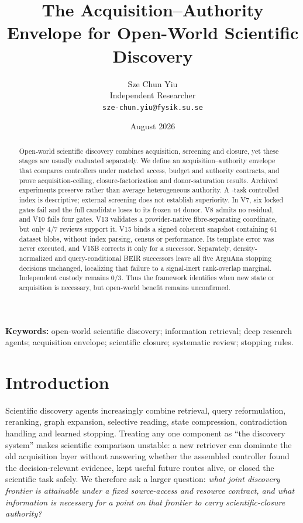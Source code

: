 \documentclass[11pt]{article}
\title{The Acquisition--Authority Envelope for Open-World Scientific Discovery}
\author{Sze Chun Yiu\\Independent Researcher\\\texttt{sze-chun.yiu@fysik.su.se}}
\date{August 2026}
\theoremstyle{definition}
\begin{document}
\maketitle

\begin{abstract}
Open-world scientific discovery combines acquisition, screening and closure,
yet these stages are usually evaluated separately. We define an
acquisition--authority envelope that compares controllers under matched access,
budget and authority contracts, and prove acquisition-ceiling,
closure-factorization and donor-saturation results. Archived experiments
preserve rather than average heterogeneous authority. A \OfflineTaskCount{}-task controlled
index is descriptive; external screening does not establish superiority. In
V7, six locked gates fail and the full candidate loses to its frozen u4 donor.
V8 admits no residual, and V10 fails four gates. V13 validates a provider-native
fibre-separating coordinate, but only 4/7 reviews support it. V15 binds a signed
coherent snapshot containing 61 dataset blobs, without index parsing, census or
performance. Its template error was never executed, and V15B corrects it only
for a successor. Separately, density-normalized and query-conditional BEIR
successors leave all five ArguAna stopping decisions unchanged, localizing that
failure to a signal-inert rank-overlap marginal. Independent custody remains
0/3. Thus the framework identifies
when new state or acquisition is necessary, but open-world benefit remains
unconfirmed.
\end{abstract}

\noindent\textbf{Keywords:} open-world scientific discovery; information retrieval; deep research agents; acquisition envelope; scientific closure; systematic review; stopping rules.

\section{Introduction}
Scientific discovery agents increasingly combine retrieval, query reformulation,
reranking, graph expansion, selective reading, state compression, contradiction
handling and learned stopping.  Treating any one component as ``the discovery
system'' makes scientific comparison unstable: a new retriever can dominate the
old acquisition layer without answering whether the assembled controller found
the decision-relevant evidence, kept useful future routes alive, or closed the
scientific task safely.  We therefore ask a larger question: \emph{what joint
discovery frontier is attainable under a fixed source-access and resource
contract, and what information is necessary for a point on that frontier to
carry scientific-closure authority?}
\end{document}
